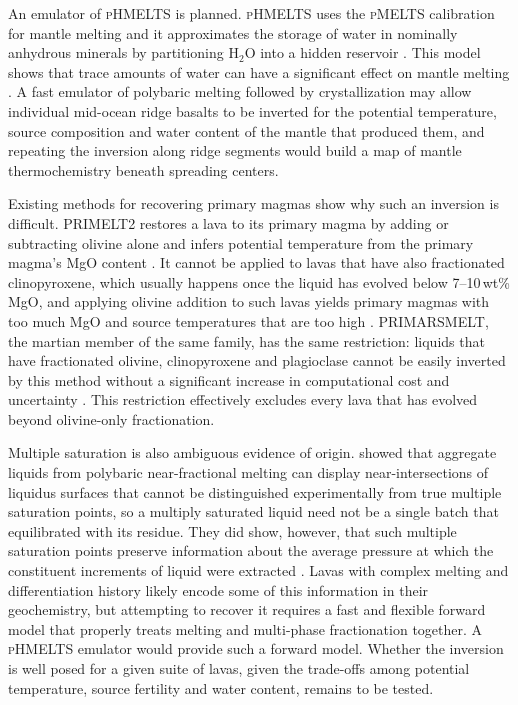 An emulator of \textsc{pHMELTS} is planned. \textsc{pHMELTS} uses the \textsc{pMELTS} calibration for mantle melting and it approximates 
the storage of water in nominally anhydrous minerals by
partitioning H$_2$O into a hidden reservoir \citep{asimow2004,smithasimow2005}. This model shows that trace amounts of water can have a
significant effect on mantle melting \citep{asimowlangmuir2003,asimow2004}. A fast emulator of polybaric melting followed by crystallization
may allow individual mid-ocean ridge basalts to be inverted for the potential temperature, source composition and water content
of the mantle that produced them, and repeating the inversion along ridge segments would build a map of mantle thermochemistry
beneath spreading centers.

Existing methods for recovering primary magmas show why such an inversion is difficult. PRIMELT2 restores a lava to its primary
magma by adding or subtracting olivine alone and infers potential temperature from the primary magma's MgO content
\citep{herzberg2008}. It cannot be applied to lavas that have also fractionated clinopyroxene, which usually happens once the
liquid has evolved below 7--10\,wt\% MgO, and applying olivine addition to such lavas yields primary magmas with too much MgO and
source temperatures that are too high \citep{herzberg2008}. PRIMARSMELT, the martian member of the same family, has the same
restriction: liquids that have fractionated olivine, clinopyroxene and plagioclase cannot be easily inverted by this method without
a significant increase in computational cost and uncertainty \citep{hernandezmontenegro2024}. This restriction effectively excludes every lava that has
evolved beyond olivine-only fractionation.

Multiple saturation is also ambiguous evidence of origin. \citet{asimowlonghi2004} showed that aggregate liquids from polybaric
near-fractional melting can display near-intersections of liquidus surfaces that cannot be distinguished experimentally from true
multiple saturation points, so a multiply saturated liquid need not be a single batch that equilibrated with its residue. They did show, however, 
that such multiple saturation points preserve information about the average pressure at which the constituent increments of
liquid were extracted \citep{asimowlonghi2004}. Lavas with complex melting and differentiation history likely encode some of this information in their
geochemistry, but attempting to recover it requires a fast and flexible forward model that properly treats melting and multi-phase fractionation
together. A \textsc{pHMELTS} emulator would provide such a forward model. Whether the
inversion is well posed for a given suite of lavas, given the trade-offs among potential temperature, source fertility and water
content, remains to be tested.

